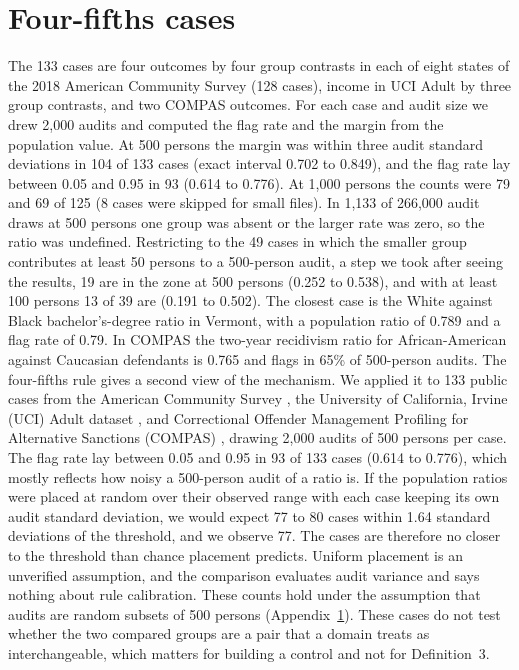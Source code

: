 \documentclass[10pt]{article}
\theoremstyle{definition}
\begin{document}
\section{Four-fifths cases}
\label{apd:fourfifths}
The 133 cases are four outcomes by four group contrasts in each of eight states of the 2018 American Community Survey (128 cases), income in UCI Adult by three group contrasts, and two COMPAS outcomes. For each case and audit size we drew 2,000 audits and computed the flag rate and the margin from the population value. At 500 persons the margin was within three audit standard deviations in 104 of 133 cases (exact interval 0.702 to 0.849), and the flag rate lay between 0.05 and 0.95 in 93 (0.614 to 0.776). At 1,000 persons the counts were 79 and 69 of 125 (8 cases were skipped for small files). In 1,133 of 266,000 audit draws at 500 persons one group was absent or the larger rate was zero, so the ratio was undefined. Restricting to the 49 cases in which the smaller group contributes at least 50 persons to a 500-person audit, a step we took after seeing the results, 19 are in the zone at 500 persons (0.252 to 0.538), and with at least 100 persons 13 of 39 are (0.191 to 0.502). The closest case is the White against Black bachelor's-degree ratio in Vermont, with a population ratio of 0.789 and a flag rate of 0.79. In COMPAS the two-year recidivism ratio for African-American against Caucasian defendants is 0.765 and flags in 65\% of 500-person audits. The four-fifths rule gives a second view of the mechanism. We applied it to 133 public cases from the American Community Survey \citep{ding2021retiring}, the University of California, Irvine (UCI) Adult dataset \citep{ucicadult}, and Correctional Offender Management Profiling for Alternative Sanctions (COMPAS) \citep{angwin2016machinebias}, drawing 2,000 audits of 500 persons per case. The flag rate lay between 0.05 and 0.95 in 93 of 133 cases (0.614 to 0.776), which mostly reflects how noisy a 500-person audit of a ratio is. If the population ratios were placed at random over their observed range with each case keeping its own audit standard deviation, we would expect 77 to 80 cases within 1.64 standard deviations of the threshold, and we observe 77. The cases are therefore no closer to the threshold than chance placement predicts. Uniform placement is an unverified assumption, and the comparison evaluates audit variance and says nothing about rule calibration. These counts hold under the assumption that audits are random subsets of 500 persons (Appendix~\ref{apd:fourfifths}). These cases do not test whether the two compared groups are a pair that a domain treats as interchangeable, which matters for building a control and not for Definition~3.
\end{document}
